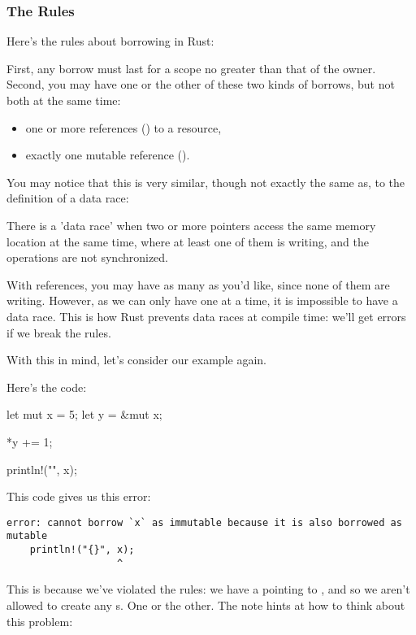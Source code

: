 \subsubsection*{The Rules}

Here's the rules about borrowing in Rust:

First, any borrow must last for a scope no greater than that of the owner. Second, you may have one or the other of these two 
kinds of borrows, but not both at the same time:

\begin{itemize}
  \item{one or more references () to a resource,}
  \item{exactly one mutable reference ().}
\end{itemize}

You may notice that this is very similar, though not exactly the same as, to the definition of a data race:

\begin{myquote}
There is a 'data race' when two or more pointers access the same memory location at the same time, where at least one of 
them is writing, and the operations are not synchronized.
\end{myquote}

With references, you may have as many as you'd like, since none of them are writing. However, as we can only have one 
at a time, it is impossible to have a data race. This is how Rust prevents data races at compile time: we'll get errors if we break 
the rules.

\blank

With this in mind, let's consider our example again.


Here's the code:

\begin{rustc}
let mut x = 5;
let y = &mut x;

*y += 1;

println!("{}", x);
\end{rustc}

This code gives us this error:

\begin{verbatim}
error: cannot borrow `x` as immutable because it is also borrowed as mutable
    println!("{}", x);
                   ^
\end{verbatim}

This is because we've violated the rules: we have a  pointing to \x, and so we aren't allowed to create any 
s. One or the other. The note hints at how to think about this problem:

